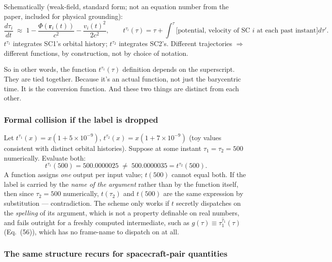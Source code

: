 \documentclass[11pt]{article}
\begin{document}
Schematically (weak-field, standard form; not an equation number from
the paper, included for physical grounding):
\begin{equation*}
  \frac{d\tau_i}{dt} \;\approx\; 1 - \frac{\Phi(\mathbf{r}_i(t))}{c^2}
  - \frac{v_i(t)^2}{2c^2}, \qquad
  t^{\tau_i}(\tau) = \tau + \int^{\tau}
  \Big[\text{potential, velocity of SC } i \text{ at each past instant}\Big] d\tau'.
\end{equation*}
$t^{\tau_1}$ integrates SC1's orbital history; $t^{\tau_2}$ integrates
SC2's. Different trajectories $\Rightarrow$ different functions, by
construction, not by choice of notation.

So in other words, the function $t^{\tau_1}(\tau)$ definition depends on the superscript. They are tied together. Because it's an actual function, not just the barycentric time. It is the conversion function. And these two things are distinct from each other.
\subsubsection{Formal collision if the label is dropped}

Let $t^{\tau_1}(x) = x(1+5\times10^{-9})$, $t^{\tau_2}(x) = x(1+7\times10^{-9})$ (toy values consistent with distinct orbital histories). Suppose at some instant $\tau_1 = \tau_2 = 500$ numerically. Evaluate both:
\begin{equation*}
  t^{\tau_1}(500) = 500.0000025 \;\neq\; 500.0000035 = t^{\tau_2}(500).
\end{equation*}
A function assigns \emph{one} output per input value; $t(500)$ cannot equal both. If the label is carried by the \emph{name of the argument} rather than by the function itself, then since $\tau_2 = 500$ numerically, $t(\tau_2)$ and $t(500)$ are the same expression by substitution — contradiction. The scheme only works if $t$ secretly dispatches on the \emph{spelling} of its argument, which is not a property definable on real numbers, and fails outright for a freshly computed intermediate, such as $g(\tau) \equiv \tau_1^{\hat\tau_1}(\tau)$ (Eq.~(56)), which has no frame-name to dispatch on at all.



\subsubsection{The same structure recurs for spacecraft-pair quantities}
\end{document}
